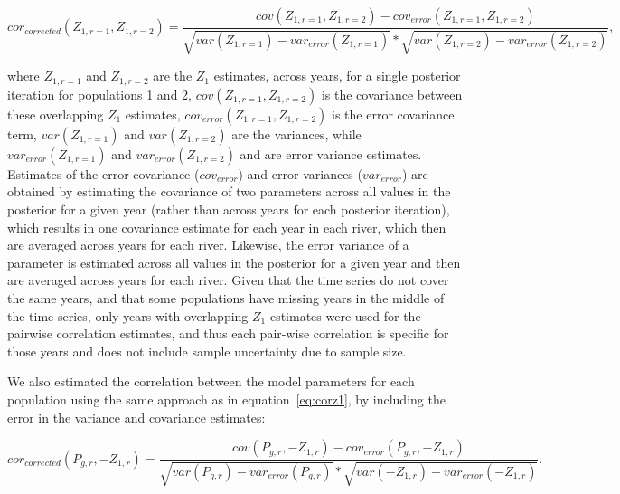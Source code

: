 \documentclass[12pt]{article}
\begin{document}
\begin{equation}
cor_{corrected}(Z_{1,r=1},Z_{1,r=2}) = \frac{cov(Z_{1,r=1}, Z_{1,r=2}) - cov_{error}(Z_{1,r=1}, Z_{1,r=2})}{\sqrt{var(Z_{1,r=1}) - var_{error}(Z_{1,r=1})}*\sqrt{var(Z_{1,r=2}) - var_{error}(Z_{1,r=2})}}, \label{eq:corz1}
\end{equation}


where $Z_{1,r=1}$ and $Z_{1,r=2}$ are the $Z_1$ estimates, across years, for a
single posterior iteration for populations 1 and 2,
$cov(Z_{1,r=1}, Z_{1,r=2})$ is the covariance between these overlapping $Z_1$ estimates,
$cov_{error}(Z_{1,r=1}, Z_{1,r=2})$ is the error covariance term,
$var(Z_{1,r=1})$ and $var(Z_{1,r=2})$ are the variances, while
$var_{error}(Z_{1,r=1})$ and $var_{error}(Z_{1,r=2})$ and are error variance estimates.
Estimates of the error covariance ($cov_{error}$) and error
variances ($var_{error}$) are obtained by estimating the covariance of
two parameters across all values in the posterior for a given year (rather
than across years for each posterior iteration), which results in one
covariance estimate for each year in each river, which then are averaged
across years for each river. Likewise, the error variance of a parameter is estimated
across all values in the posterior for a given year and then are averaged
across years for each river.
Given that the time series do not cover the same years, and that some populations
have missing years in the middle of the time series, only years with overlapping
$Z_1$ estimates were used for the pairwise correlation estimates, and thus
each pair-wise correlation is specific for those years and does not include sample uncertainty due to sample size.

We also estimated the correlation between the model parameters for each population using
the same approach as in equation~\ref{eq:corz1},
by including the error in the variance and covariance estimates:

\begin{equation}
cor_{corrected}(P_{g,r},-Z_{1,r}) = \frac{cov(P_{g,r}, -Z_{1,r}) - cov_{error}(P_{g,r}, -Z_{1,r})}{\sqrt{var(P_{g,r})- var_{error}(P_{g,r})}*\sqrt{var(-Z_{1,r}) - var_{error}(-Z_{1,r})}}\label{eq:corparam}.
\end{equation}
\end{document}
